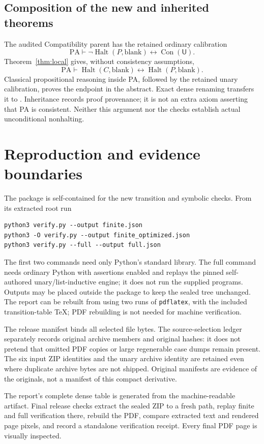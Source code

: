 \documentclass[11pt,letterpaper]{article}
\newcommand{\PA}{\mathrm{PA}}\newcommand{\UU}{\mathsf U}
\newcommand{\Con}{\operatorname{Con}}\newcommand{\Halt}{\operatorname{Halt}}
\begin{document}
\subsection{Composition of the new and inherited theorems}
The audited Compatibility parent has the retained ordinary calibration
\[
 \PA\vdash\neg\Halt(P,\mathrm{blank})\leftrightarrow\Con(\UU).
\]
Theorem~\ref{thm:local} gives, without consistency assumptions,
\[
 \PA\vdash\Halt(C,\mathrm{blank})\leftrightarrow\Halt(P,\mathrm{blank}).
\]
Classical propositional reasoning inside PA, followed by the retained
unary calibration, proves the endpoint in the abstract. Exact dense
renaming transfers it to . Inheritance records
proof provenance; it is not an extra axiom asserting that PA is
consistent. Neither this argument nor the checks establish actual
unconditional nonhalting.

\section{Reproduction and evidence boundaries}
The package is self-contained for the new transition and symbolic
checks. From its extracted root run
\begin{verbatim}
python3 verify.py --output finite.json
python3 -O verify.py --output finite_optimized.json
python3 verify.py --full --output full.json
\end{verbatim}
The first two commands need only Python's standard library. The full
command needs ordinary Python with assertions enabled and replays the
pinned self-authored unary/list-inductive engine; it does not run the
supplied programs. Outputs may be placed outside the package to keep
the sealed tree unchanged. The report can be rebuilt from
 using two runs of \texttt{pdflatex}, with the
included transition-table TeX; PDF rebuilding is not needed for machine
verification.

The release manifest binds all selected file bytes. The source-selection
ledger separately records original archive members and original hashes:
it does not pretend that omitted PDF copies or large regenerable case
dumps remain present. The six input ZIP identities and the unary
archive identity are retained even where duplicate archive bytes are
not shipped. Original manifests are evidence of the originals, not a
manifest of this compact derivative.

The report's complete dense table is generated from the machine-readable
artifact. Final release checks extract the sealed ZIP to a fresh path,
replay finite and full verification there, rebuild the PDF, compare
extracted text and rendered page pixels, and record a standalone
verification receipt. Every final PDF page is visually inspected.
\end{document}
